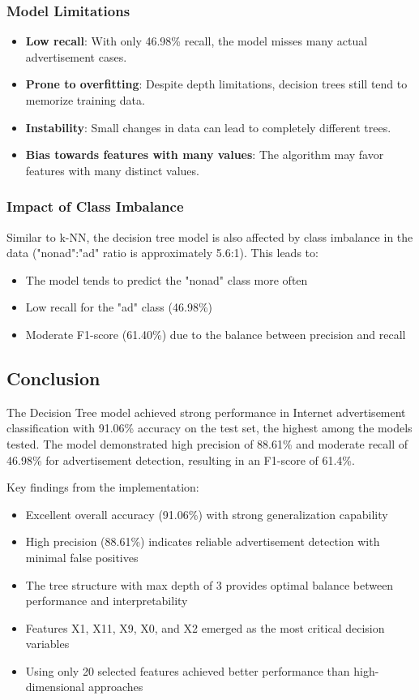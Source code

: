 \subsubsection{Model Limitations}

\begin{itemize}
    \item \textbf{Low recall}: With only 46.98\% recall, the model misses many actual advertisement cases.
    \item \textbf{Prone to overfitting}: Despite depth limitations, decision trees still tend to memorize training data.
    \item \textbf{Instability}: Small changes in data can lead to completely different trees.
    \item \textbf{Bias towards features with many values}: The algorithm may favor features with many distinct values.
\end{itemize}

\subsubsection{Impact of Class Imbalance}

Similar to k-NN, the decision tree model is also affected by class imbalance in the data ("nonad":"ad" ratio is approximately 5.6:1). This leads to:

\begin{itemize}
    \item The model tends to predict the "nonad" class more often
    \item Low recall for the "ad" class (46.98\%)
    \item Moderate F1-score (61.40\%) due to the balance between precision and recall
\end{itemize}

\subsection{Conclusion}

The Decision Tree model achieved strong performance in Internet advertisement classification with 91.06\% accuracy on the test set, the highest among the models tested. The model demonstrated high precision of 88.61\% and moderate recall of 46.98\% for advertisement detection, resulting in an F1-score of 61.4\%. 

Key findings from the implementation:
\begin{itemize}
    \item Excellent overall accuracy (91.06\%) with strong generalization capability
    \item High precision (88.61\%) indicates reliable advertisement detection with minimal false positives
    \item The tree structure with max depth of 3 provides optimal balance between performance and interpretability
    \item Features X1, X11, X9, X0, and X2 emerged as the most critical decision variables
    \item Using only 20 selected features achieved better performance than high-dimensional approaches
\end{itemize}

